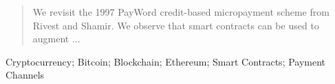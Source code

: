 
\begin{abstract}

We revisit the 1997 PayWord credit-based micropayment scheme from Rivest and Shamir. We observe that smart contracts can be used to augment ... 


\end{abstract}

\begin{IEEEkeywords}
Cryptocurrency; Bitcoin; Blockchain; Ethereum; Smart Contracts; Payment Channels
\end{IEEEkeywords}
